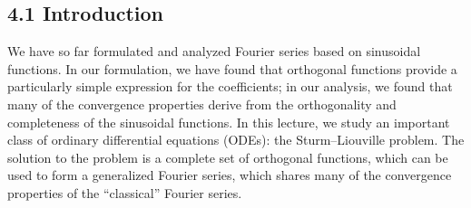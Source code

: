

\subsection{4.1 Introduction}
We have so far formulated and analyzed Fourier series based on sinusoidal functions. In our formulation, we have found that orthogonal functions provide a particularly simple expression for the coefficients; in our analysis, we found that many of the convergence properties derive from the orthogonality and completeness of the sinusoidal functions. In this lecture, we study an important class of ordinary differential equations (ODEs): the Sturm--Liouville problem. The solution to the problem is a complete set of orthogonal functions, which can be used to form a generalized Fourier series, which shares many of the convergence properties of the ``classical'' Fourier series.

